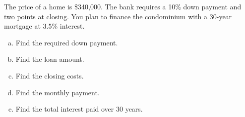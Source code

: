 \begin{try}
The price of a home is \$340,000.  The bank requires a 10\% down payment and two points at closing.  You plan to finance the condominium with a 30-year mortgage at 3.5\% interest.
\begin{enumerate}[(a)]
\item Find the required down payment.
\item Find the loan amount.
\item Find the closing costs.
\item Find the monthly payment.
\item Find the total interest paid over 30 years.
\end{enumerate}
\end{try}
\pagebreak

